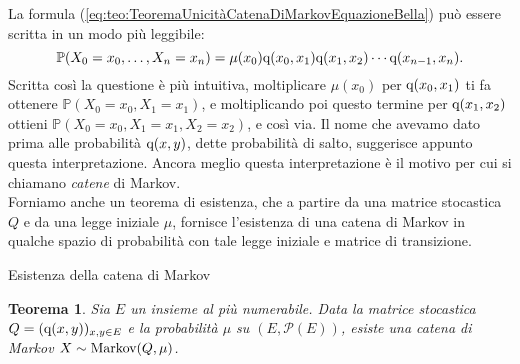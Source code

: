 \documentclass[11pt]{book}
\theoremstyle{Definizione}
\theoremstyle{TeoremaProposizioneLemmaCorollario}
\newtheorem{myteo}{Teorema}[section]
\theoremstyle{OsservazioneNota}
\renewcommand{\P}{\mathbb{P}}
\newcommand{\q}{\textup{q}}
\begin{document}
\noindent
La formula (\ref{eq:teo:TeoremaUnicitàCatenaDiMarkovEquazioneBella}) può essere scritta in un modo più leggibile:
\begin{equation}\label{eq:CatenaDiMarkovFormulaBellaBella}
\P(X_0 = x_0, \dots,X_n = x_n) = \mu(x_0) \q(x_0,x_1)\q(x_1,x_2)\cdots \q(x_{n-1},x_n).
\end{equation}
Scritta così la questione è più intuitiva, moltiplicare $\mu(x_0)$ per $\q(x_0,x_1)$ ti fa ottenere $\P(X_0 = x_0,X_1 = x_1)$, e moltiplicando poi questo termine per $\q(x_1,x_2)$ ottieni $\P(X_0 = x_0, X_1 = x_1, X_2 = x_2)$, e così via. Il nome che avevamo dato prima alle probabilità $\q(x,y)$, dette probabilità di salto, suggerisce appunto questa interpretazione. Ancora meglio questa interpretazione è il motivo per cui si chiamano \textsl{catene} di Markov.\\
Forniamo anche un teorema di esistenza, che a partire da una matrice stocastica $Q$ e da una legge iniziale $\mu$, fornisce l'esistenza di una catena di Markov in qualche spazio di probabilità con tale legge iniziale e matrice di transizione.
\begin{boxteo}{Esistenza della catena di Markov}
\begin{myteo}
Sia $E$ un insieme al più numerabile. Data la matrice stocastica $Q = (\q(x,y))_{x,y\in E}$ e la probabilità $\mu$ su $(E,\mathcal{P}(E))$, esiste una catena di Markov $X\sim \textup{Markov}(Q,\mu)$.
\end{myteo}
\end{boxteo}
\end{document}
